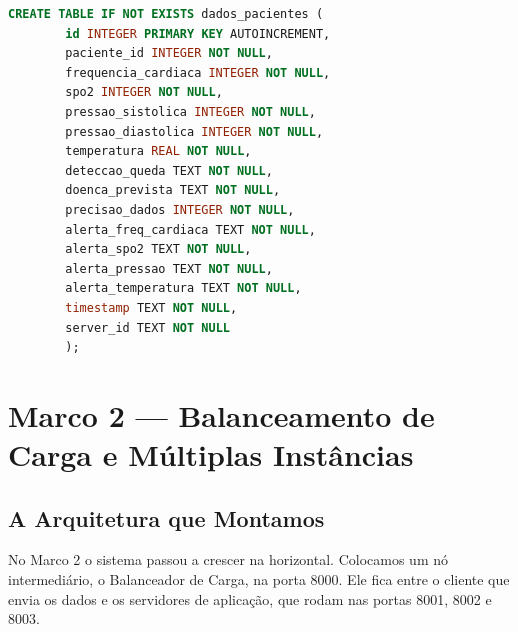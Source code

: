\documentclass[12pt,a4paper]{article}
\begin{document}
	\begin{lstlisting}[language=SQL, caption={Estrutura da Tabela no SQLite}]
		CREATE TABLE IF NOT EXISTS dados_pacientes (
		id INTEGER PRIMARY KEY AUTOINCREMENT,
		paciente_id INTEGER NOT NULL,
		frequencia_cardiaca INTEGER NOT NULL,
		spo2 INTEGER NOT NULL,
		pressao_sistolica INTEGER NOT NULL,
		pressao_diastolica INTEGER NOT NULL,
		temperatura REAL NOT NULL,
		deteccao_queda TEXT NOT NULL,
		doenca_prevista TEXT NOT NULL,
		precisao_dados INTEGER NOT NULL,
		alerta_freq_cardiaca TEXT NOT NULL,
		alerta_spo2 TEXT NOT NULL,
		alerta_pressao TEXT NOT NULL,
		alerta_temperatura TEXT NOT NULL,
		timestamp TEXT NOT NULL,
		server_id TEXT NOT NULL
		);
	\end{lstlisting}
	
	\section{Marco 2 — Balanceamento de Carga e Múltiplas Instâncias}
	
	\subsection{A Arquitetura que Montamos}
	No Marco 2 o sistema passou a crescer na horizontal. Colocamos um nó intermediário, o Balanceador de Carga, na porta 8000. Ele fica entre o cliente que envia os dados e os servidores de aplicação, que rodam nas portas 8001, 8002 e 8003.
	
\end{document}

